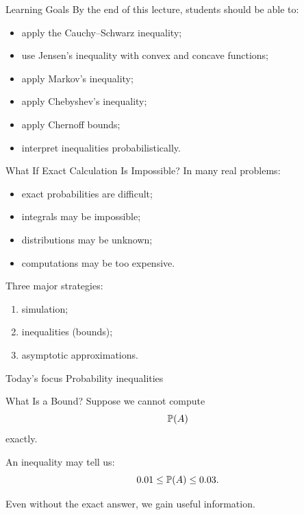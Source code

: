 \setcounter{framenumber}{0}

\begin{frame}
  \titlepage
\end{frame}

\begin{frame}{Learning Goals}
By the end of this lecture, students should be able to:
\begin{itemize}
    \item apply the Cauchy--Schwarz inequality;
    \item use Jensen's inequality with convex and concave functions;
    \item apply Markov's inequality;
    \item apply Chebyshev's inequality;
    \item apply Chernoff bounds;
    \item interpret inequalities probabilistically.
\end{itemize}
\end{frame}


\begin{frame}{What If Exact Calculation Is Impossible?}
In many real problems:
\begin{itemize}
    \item exact probabilities are difficult;
    \item integrals may be impossible;
    \item distributions may be unknown;
    \item computations may be too expensive.
\end{itemize}

\vspace{0.25cm}

Three major strategies:
\begin{enumerate}
    \item simulation;
    \item inequalities (bounds);
    \item asymptotic approximations.
\end{enumerate}

\vspace{0.25cm}

\begin{keybox}{Today's focus}
Probability inequalities
\end{keybox}
\end{frame}

\begin{frame}{What Is a Bound?}
Suppose we cannot compute
\[
\mathbb{P}(A)
\]
exactly.

\vspace{0.25cm}

An inequality may tell us:
\[
0.01
\le
\mathbb{P}(A)
\le
0.03.
\]

\vspace{0.25cm}

Even without the exact answer, we gain useful information.

\end{frame}

